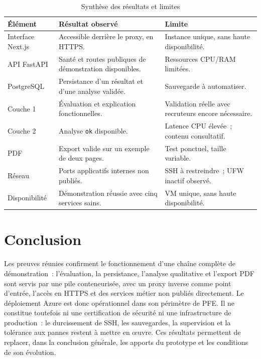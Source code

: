 \begin{table}[H]
\centering
\small
\caption{Synthèse des résultats et limites}
\label{tab:chap6-deployment-summary}
\begin{tabularx}{\textwidth}{|p{}|X|X|}
\hline
\textbf{Élément} & \textbf{Résultat observé} & \textbf{Limite}\\
\hline
Interface Next.js & Accessible derrière le proxy, en HTTPS. & Instance unique, sans haute disponibilité.\\
\hline
API FastAPI & Santé et routes publiques de démonstration disponibles. & Ressources CPU/RAM limitées.\\
\hline
PostgreSQL & Persistance d'un résultat et d'une analyse validée. & Sauvegarde à automatiser.\\
\hline
Couche 1 & Évaluation et explication fonctionnelles. & Validation réelle avec recruteurs encore nécessaire.\\
\hline
Couche 2 & Analyse \texttt{ok} disponible. & Latence CPU élevée~; contenu consultatif.\\
\hline
PDF & Export valide sur un exemple de deux pages. & Test ponctuel, taille variable.\\
\hline
Réseau & Ports applicatifs internes non publiés. & SSH à restreindre~; UFW inactif observé.\\
\hline
Disponibilité & Démonstration réussie avec cinq services sains. & VM unique, sans haute disponibilité.\\
\hline
\end{tabularx}
\end{table}

\section*{Conclusion}

Les preuves réunies confirment le fonctionnement d'une chaîne complète de démonstration~: l'évaluation, la persistance, l'analyse qualitative et l'export PDF sont servis par une pile conteneurisée, avec un proxy inverse comme point d'entrée, l'accès en HTTPS et des services métier non publiés directement. Le déploiement Azure est donc opérationnel dans son périmètre de PFE. Il ne constitue toutefois ni une certification de sécurité ni une infrastructure de production~: le durcissement de SSH, les sauvegardes, la supervision et la tolérance aux pannes restent à mettre en œuvre. Ces résultats permettent de replacer, dans la conclusion générale, les apports du prototype et les conditions de son évolution.
